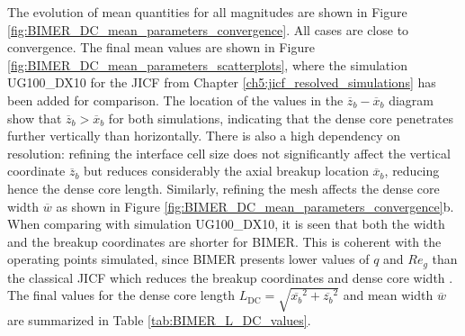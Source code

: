 The evolution of mean quantities for all magnitudes are shown in Figure \ref{fig:BIMER_DC_mean_parameters_convergence}. All cases are close to convergence. The final mean values are shown in Figure \ref{fig:BIMER_DC_mean_parameters_scatterplots}, where the simulation UG100\_DX10 for the JICF from Chapter \ref{ch5:jicf_resolved_simulations} has been added for comparison. The location of the values in the $\overline{z}_b - \overline{x}_b$ diagram show that $\overline{z}_b > \overline{x}_b$ for both simulations, indicating that the dense core penetrates further vertically than horizontally. There is also a high dependency on resolution: refining the interface cell size does not significantly affect the vertical coordinate $\overline{z}_b$ but reduces considerably the axial breakup location $\overline{x}_b$, reducing hence the dense core length. Similarly, refining the mesh affects the dense core width $\overline{w}$ as shown in Figure \ref{fig:BIMER_DC_mean_parameters_convergence}b.  When comparing with simulation UG100\_DX10, it is seen that both the width and the breakup coordinates are shorter for BIMER. This is coherent with the operating points simulated, since BIMER presents lower values of $q$ and $Re_g$ than the classical JICF which reduces the breakup coordinates and dense core width . The final values for the dense core length $L_\mathrm{DC} = \sqrt{\overline{x_b}^2 + \overline{z_b}^2}$ and mean width $\overline{w}$ are summarized in Table \ref{tab:BIMER_L_DC_values}.


